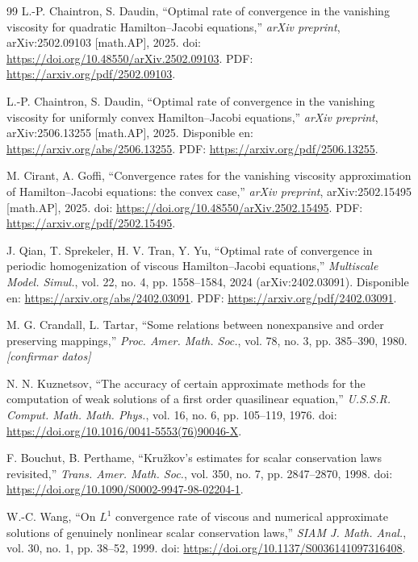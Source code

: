 \documentclass[11pt,letterpaper]{article}
\theoremstyle{plain}
\theoremstyle{definition}
\theoremstyle{remark}
\numberwithin{equation}{section}
\newcommand{\ph}[1]{\textcolor{red!70!black}{\textit{[#1]}}}
\begin{document}
\begin{thebibliography}{99}
		L.-P. Chaintron, S. Daudin, ``Optimal rate of convergence in the vanishing viscosity for quadratic Hamilton--Jacobi equations,'' \emph{arXiv preprint}, arXiv:2502.09103 [math.AP], 2025.
		doi: \url{https://doi.org/10.48550/arXiv.2502.09103}.
		PDF: \url{https://arxiv.org/pdf/2502.09103}.
		
		L.-P. Chaintron, S. Daudin, ``Optimal rate of convergence in the vanishing viscosity for uniformly convex Hamilton--Jacobi equations,'' \emph{arXiv preprint}, arXiv:2506.13255 [math.AP], 2025.
		Disponible en: \url{https://arxiv.org/abs/2506.13255}.
		PDF: \url{https://arxiv.org/pdf/2506.13255}.
		
		M. Cirant, A. Goffi, ``Convergence rates for the vanishing viscosity approximation of Hamilton--Jacobi equations: the convex case,'' \emph{arXiv preprint}, arXiv:2502.15495 [math.AP], 2025.
		doi: \url{https://doi.org/10.48550/arXiv.2502.15495}.
		PDF: \url{https://arxiv.org/pdf/2502.15495}.
		
		J. Qian, T. Sprekeler, H. V. Tran, Y. Yu, ``Optimal rate of convergence in periodic homogenization of viscous Hamilton--Jacobi equations,'' \emph{Multiscale Model. Simul.}, vol. 22, no. 4, pp. 1558--1584, 2024 (arXiv:2402.03091).
		Disponible en: \url{https://arxiv.org/abs/2402.03091}.
		PDF: \url{https://arxiv.org/pdf/2402.03091}.
		
		M. G. Crandall, L. Tartar, ``Some relations between nonexpansive and order preserving mappings,'' \emph{Proc. Amer. Math. Soc.}, vol. 78, no. 3, pp. 385--390, 1980. \ph{confirmar datos}
		
		N. N. Kuznetsov, ``The accuracy of certain approximate methods for the computation of weak solutions of a first order quasilinear equation,'' \emph{U.S.S.R. Comput. Math. Math. Phys.}, vol. 16, no. 6, pp. 105--119, 1976.
		doi: \url{https://doi.org/10.1016/0041-5553(76)90046-X}.
		
		F. Bouchut, B. Perthame, ``Kru\v{z}kov's estimates for scalar conservation laws revisited,'' \emph{Trans. Amer. Math. Soc.}, vol. 350, no. 7, pp. 2847--2870, 1998.
		doi: \url{https://doi.org/10.1090/S0002-9947-98-02204-1}.
		
		W.-C. Wang, ``On \(L^1\) convergence rate of viscous and numerical approximate solutions of genuinely nonlinear scalar conservation laws,'' \emph{SIAM J. Math. Anal.}, vol. 30, no. 1, pp. 38--52, 1999.
		doi: \url{https://doi.org/10.1137/S0036141097316408}.
		

\end{thebibliography}
\end{document}

